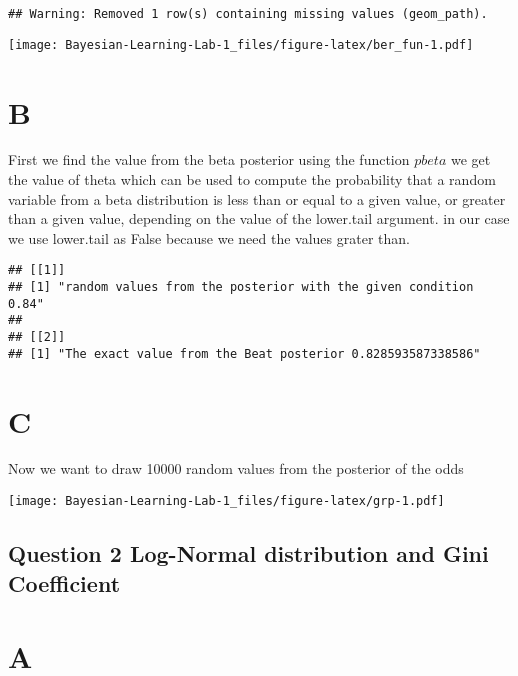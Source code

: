 \documentclass[
]{article}
\begin{document}
\begin{verbatim}
## Warning: Removed 1 row(s) containing missing values (geom_path).
\end{verbatim}

\texttt{[image: Bayesian-Learning-Lab-1\_files/figure-latex/ber\_fun-1.pdf]}

\hypertarget{b}{%
\section{B}\label{b}}

First we find the value from the beta posterior using the function
\(pbeta\) we get the value of theta which can be used to compute the
probability that a random variable from a beta distribution is less than
or equal to a given value, or greater than a given value, depending on
the value of the lower.tail argument. in our case we use lower.tail as
False because we need the values grater than.

\begin{verbatim}
## [[1]]
## [1] "random values from the posterior with the given condition 0.84"
## 
## [[2]]
## [1] "The exact value from the Beat posterior 0.828593587338586"
\end{verbatim}

\hypertarget{c}{%
\section{C}\label{c}}

Now we want to draw 10000 random values from the posterior of the odds

\texttt{[image: Bayesian-Learning-Lab-1\_files/figure-latex/grp-1.pdf]}

\hypertarget{question-2-log-normal-distribution-and-gini-coefficient}{%
\subsection{Question 2 Log-Normal distribution and Gini
Coefficient}\label{question-2-log-normal-distribution-and-gini-coefficient}}

\hypertarget{a}{%
\section{A}\label{a}}
\end{document}
